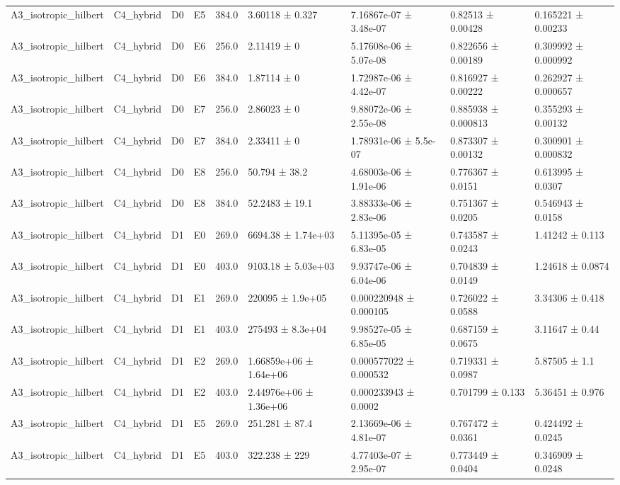 \begin{table}
\begin{tabular}{lllllllll}
A3\_isotropic\_hilbert & C4\_hybrid & D0 & E5 & 384.0 & 3.60118 ± 0.327 & 7.16867e-07 ± 3.48e-07 & 0.82513 ± 0.00428 & 0.165221 ± 0.00233 \\
A3\_isotropic\_hilbert & C4\_hybrid & D0 & E6 & 256.0 & 2.11419 ± 0 & 5.17608e-06 ± 5.07e-08 & 0.822656 ± 0.00189 & 0.309992 ± 0.000992 \\
A3\_isotropic\_hilbert & C4\_hybrid & D0 & E6 & 384.0 & 1.87114 ± 0 & 1.72987e-06 ± 4.42e-07 & 0.816927 ± 0.00222 & 0.262927 ± 0.000657 \\
A3\_isotropic\_hilbert & C4\_hybrid & D0 & E7 & 256.0 & 2.86023 ± 0 & 9.88072e-06 ± 2.55e-08 & 0.885938 ± 0.000813 & 0.355293 ± 0.00132 \\
A3\_isotropic\_hilbert & C4\_hybrid & D0 & E7 & 384.0 & 2.33411 ± 0 & 1.78931e-06 ± 5.5e-07 & 0.873307 ± 0.00132 & 0.300901 ± 0.000832 \\
A3\_isotropic\_hilbert & C4\_hybrid & D0 & E8 & 256.0 & 50.794 ± 38.2 & 4.68003e-06 ± 1.91e-06 & 0.776367 ± 0.0151 & 0.613995 ± 0.0307 \\
A3\_isotropic\_hilbert & C4\_hybrid & D0 & E8 & 384.0 & 52.2483 ± 19.1 & 3.88333e-06 ± 2.83e-06 & 0.751367 ± 0.0205 & 0.546943 ± 0.0158 \\
A3\_isotropic\_hilbert & C4\_hybrid & D1 & E0 & 269.0 & 6694.38 ± 1.74e+03 & 5.11395e-05 ± 6.83e-05 & 0.743587 ± 0.0243 & 1.41242 ± 0.113 \\
A3\_isotropic\_hilbert & C4\_hybrid & D1 & E0 & 403.0 & 9103.18 ± 5.03e+03 & 9.93747e-06 ± 6.04e-06 & 0.704839 ± 0.0149 & 1.24618 ± 0.0874 \\
A3\_isotropic\_hilbert & C4\_hybrid & D1 & E1 & 269.0 & 220095 ± 1.9e+05 & 0.000220948 ± 0.000105 & 0.726022 ± 0.0588 & 3.34306 ± 0.418 \\
A3\_isotropic\_hilbert & C4\_hybrid & D1 & E1 & 403.0 & 275493 ± 8.3e+04 & 9.98527e-05 ± 6.85e-05 & 0.687159 ± 0.0675 & 3.11647 ± 0.44 \\
A3\_isotropic\_hilbert & C4\_hybrid & D1 & E2 & 269.0 & 1.66859e+06 ± 1.64e+06 & 0.000577022 ± 0.000532 & 0.719331 ± 0.0987 & 5.87505 ± 1.1 \\
A3\_isotropic\_hilbert & C4\_hybrid & D1 & E2 & 403.0 & 2.44976e+06 ± 1.36e+06 & 0.000233943 ± 0.0002 & 0.701799 ± 0.133 & 5.36451 ± 0.976 \\
A3\_isotropic\_hilbert & C4\_hybrid & D1 & E5 & 269.0 & 251.281 ± 87.4 & 2.13669e-06 ± 4.81e-07 & 0.767472 ± 0.0361 & 0.424492 ± 0.0245 \\
A3\_isotropic\_hilbert & C4\_hybrid & D1 & E5 & 403.0 & 322.238 ± 229 & 4.77403e-07 ± 2.95e-07 & 0.773449 ± 0.0404 & 0.346909 ± 0.0248 \\

\end{tabular}
\end{table}
